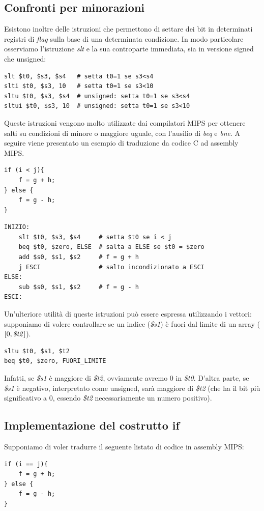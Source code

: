 \documentclass[class=book, crop=false]{standalone}
\begin{document}
\subsection{Confronti per minorazioni}
Esistono inoltre delle istruzioni che permettono di settare dei bit in determinati registri di \emph{flag} sulla base di una determinata condizione. In modo particolare osserviamo l'istruzione \emph{slt} e la sua controparte immediata, sia in versione signed che unsigned:
\begin{verbatim}
slt $t0, $s3, $s4   # setta t0=1 se s3<s4
slti $t0, $s3, 10   # setta t0=1 se s3<10
sltu $t0, $s3, $s4  # unsigned: setta t0=1 se s3<s4
sltui $t0, $s3, 10  # unsigned: setta t0=1 se s3<10
\end{verbatim}
Queste istruzioni vengono molto utilizzate dai compilatori MIPS per ottenere salti su condizioni di minore o maggiore uguale, con l'ausilio di \emph{beq} e \emph{bne}. A seguire viene presentato un esempio di traduzione da codice C ad assembly MIPS.
\begin{verbatim}
if (i < j){
	f = g + h;
} else {
	f = g - h;
}
\end{verbatim}
\begin{verbatim}
INIZIO:
	slt $t0, $s3, $s4     # setta $t0 se i < j
	beq $t0, $zero, ELSE  # salta a ELSE se $t0 = $zero
	add $s0, $s1, $s2     # f = g + h
	j ESCI                # salto incondizionato a ESCI
ELSE:
	sub $s0, $s1, $s2     # f = g - h
ESCI:
\end{verbatim}
Un'ulteriore utilità di queste istruzioni può essere espressa utilizzando i vettori: supponiamo di volere controllare se un indice (\emph{\$s1}) è fuori dal limite di un array (\([0, \text{\emph{\$t2}}]\)).
\begin{verbatim}
sltu $t0, $s1, $t2
beq $t0, $zero, FUORI_LIMITE
\end{verbatim}
Infatti, se \emph{\$s1} è maggiore di \emph{\$t2}, ovviamente avremo 0 in \emph{\$t0}. D'altra parte, se \emph{\$s1} è negativo, interpretato come unsigned, sarà maggiore di \emph{\$t2} (che ha il bit più significativo a 0, essendo \emph{\$t2} necessariamente un numero positivo).

\subsection{Implementazione del costrutto if}
Supponiamo di voler tradurre il seguente listato di codice in assembly MIPS:
\begin{verbatim}
if (i == j){
	f = g + h;
} else {
	f = g - h;
}
\end{verbatim}
\end{document}
